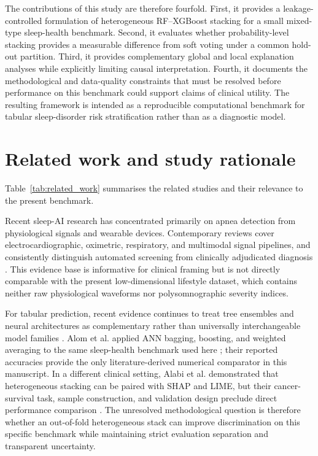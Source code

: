 \documentclass[a4paper,fleqn]{cas-dc}
\begin{document}
The contributions of this study are therefore fourfold. First, it provides a leakage-controlled formulation of heterogeneous RF--XGBoost stacking for a small mixed-type sleep-health benchmark. Second, it evaluates whether probability-level stacking provides a measurable difference from soft voting under a common hold-out partition. Third, it provides complementary global and local explanation analyses while explicitly limiting causal interpretation. Fourth, it documents the methodological and data-quality constraints that must be resolved before performance on this benchmark could support claims of clinical utility. The resulting framework is intended as a reproducible computational benchmark for tabular sleep-disorder risk stratification rather than as a diagnostic model.


\section{Related work and study rationale}
Table~\ref{tab:related_work} summarises the related studies and their relevance to the present benchmark.

Recent sleep-AI research has concentrated primarily on apnea detection from physiological signals and wearable devices. Contemporary reviews cover electrocardiographic, oximetric, respiratory, and multimodal signal pipelines, and consistently distinguish automated screening from clinically adjudicated diagnosis \cite{bazoukis2023,tyagi2023,abdalrazaq2024,giorgi2025}. This evidence base is informative for clinical framing but is not directly comparable with the present low-dimensional lifestyle dataset, which contains neither raw physiological waveforms nor polysomnographic severity indices.

For tabular prediction, recent evidence continues to treat tree ensembles and neural architectures as complementary rather than universally interchangeable model families \cite{borisov2024}. Alom et al. applied ANN bagging, boosting, and weighted averaging to the same sleep-health benchmark used here \cite{alom2024}; their reported accuracies provide the only literature-derived numerical comparator in this manuscript. In a different clinical setting, Alabi et al. demonstrated that heterogeneous stacking can be paired with SHAP and LIME, but their cancer-survival task, sample construction, and validation design preclude direct performance comparison \cite{alabi2023}. The unresolved methodological question is therefore whether an out-of-fold heterogeneous stack can improve discrimination on this specific benchmark while maintaining strict evaluation separation and transparent uncertainty.
\end{document}

